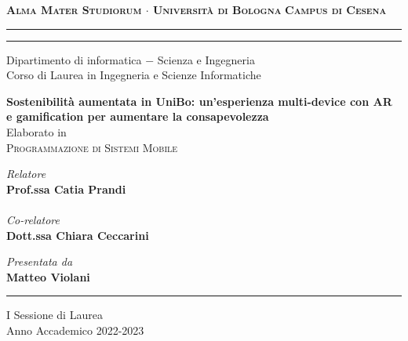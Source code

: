 \begin{titlepage}
    \begin{center}
        {\Large
            \textbf{
                \textsc{Alma Mater Studiorum $\cdot$ Università di Bologna}
            }
        }
        {\large
            \textbf{
                \textsc{Campus di Cesena}
            }
        }
        \rule[0.1cm]{16cm}{0.3mm}
        \rule[0.5cm]{16cm}{0.7mm}
        {\Large
            Dipartimento di informatica $-$ Scienza e Ingegneria \\
        }
        \vspace*{4mm}
        {\Large 
            Corso di Laurea in Ingegneria e Scienze Informatiche
        }
        \vspace*{35mm} %
        \begin{center}
            {\LARGE
                \textbf{
                    Sostenibilità aumentata in UniBo: un'esperienza multi-device con AR e gamification per aumentare la consapevolezza
                }
            } \\
            \vspace*{20mm} %
            {\Large Elaborato in} \\
            \vspace*{3mm}
            {\Large
                \textsc{Programmazione di Sistemi Mobile}
            }
        \end{center}
        \vspace*{40mm}
        \begin{minipage}[t]{0.47\textwidth}
            {\large
                \textit{Relatore} \\
                \textbf{Prof.ssa Catia Prandi} \\
                \vspace*{1mm} \\
                \textit{Co-relatore} \\
                \textbf{Dott.ssa Chiara Ceccarini} \\
            }
        \end{minipage}
        \begin{minipage}[t]{0.47\textwidth}\raggedleft
            {\large
                \textit{Presentata da} \\
                \textbf{Matteo Violani}
            }
        \end{minipage}
    \end{center}
    \begin{center}
        \vspace*{28mm}
        \rule[0.1cm]{16cm}{0.3mm}
    \end{center}
    \begin{center}
        {\large
            I Sessione di Laurea
        } \\
        \vspace*{2mm}
        {\large
            Anno Accademico 2022-2023
        }
    \end{center}
\end{titlepage}
\restoregeometry